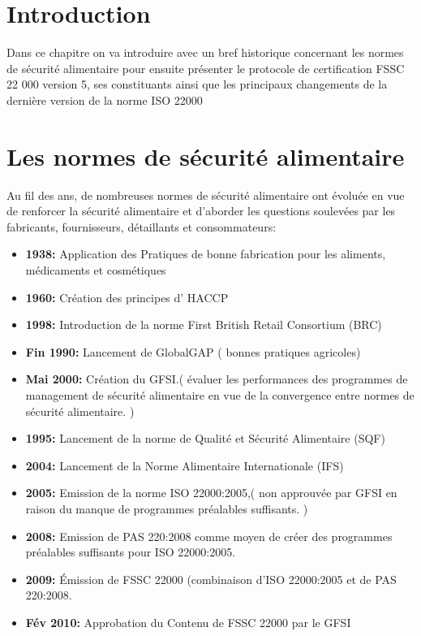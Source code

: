 \begin{spacing}{1.2}
\section*{Introduction}
Dans ce chapitre on va introduire avec un bref historique concernant les  normes de sécurité alimentaire pour ensuite présenter le protocole de certification FSSC 22 000 version 5, ses constituants ainsi que les principaux changements de la dernière version de la norme ISO 22000

\section{Les normes de sécurité alimentaire}
Au fil des ans, de nombreuses normes de sécurité alimentaire ont évoluée en vue de renforcer la sécurité alimentaire et d'aborder les questions soulevées par les fabricants, fournisseurs, détaillants et consommateurs:

\begin{itemize}
 \item \textbf{1938:} Application des Pratiques de bonne fabrication pour les aliments, médicaments et cosmétiques
  \item \textbf{1960:} Création des principes d’ HACCP
	 \item \textbf{1998:} Introduction de la norme First British Retail Consortium (BRC)
	  \item \textbf{Fin 1990:} Lancement de GlobalGAP ( bonnes pratiques agricoles)
		 \item \textbf{Mai 2000:} Création du GFSI.( évaluer les performances des programmes de management de sécurité alimentaire en vue de la convergence entre normes de sécurité alimentaire. )
		  \item \textbf{1995:} Lancement de la norme de Qualité et Sécurité Alimentaire (SQF)
			 \item \textbf{2004:} Lancement de la Norme Alimentaire Internationale (IFS)
			  \item \textbf{2005:} Emission de la norme ISO 22000:2005,( non approuvée par GFSI en raison du manque de programmes préalables suffisants. )
				 \item \textbf{2008:} Emission de PAS 220:2008 comme moyen de créer des programmes préalables suffisants pour ISO 22000:2005.
				  \item \textbf{2009:} Émission de FSSC 22000 (combinaison d’ISO 22000:2005 et de PAS 220:2008.
					 \item \textbf{Fév 2010:} Approbation du Contenu de FSSC 22000 par le GFSI
\end{itemize}

\end{spacing}
